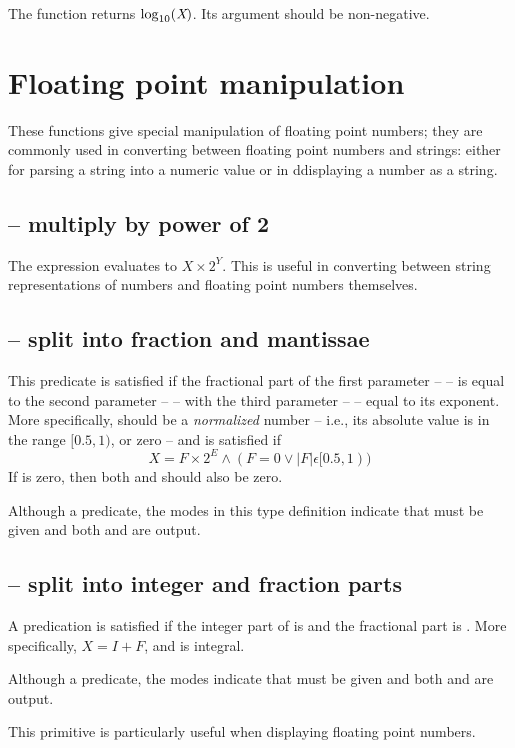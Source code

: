      
The  function returns $\log_{10}({{\mbox{\rm\em X}})}$.  Its argument should be non-negative.
        

\section{Floating point manipulation}
\label{arith:manip}

These functions give special manipulation of floating point numbers; they are commonly used in converting between floating point numbers and strings: either for parsing a string into a numeric value or in ddisplaying a number as a string.

\subsection{ -- multiply by power of 2}
\label{arith:ldexp}


The expression  evaluates to $X\times2^{Y}$. This is useful in converting between string representations of numbers and floating point numbers themselves.


\subsection{ -- split into fraction and mantissae}
\label{arith:frexp}


This predicate is satisfied if the fractional part of the first parameter --  -- is equal to the second parameter --  -- with the third parameter --  -- equal to its exponent. More specifically,  should be a \emph{normalized} number -- i.e., its absolute value is in the range $[0.5,1)$, or zero -- and  is satisfied if
\[
X=F\times2^{E} \wedge ( F=0 \vee |F| \epsilon [0.5,1) )
\]
If  is zero, then both  and  should also be zero.

Although a predicate, the modes in this type definition indicate that  must be given and both  and  are output.


\subsection{ -- split into integer and fraction parts}
\label{arith:modf}


A predication  is satisfied if the integer part of  is  and the fractional part is . More specifically,  $X=I+F$, and  is integral.

Although a predicate, the modes indicate that  must be given and both  and  are output.

This primitive is particularly useful when displaying floating point numbers.
